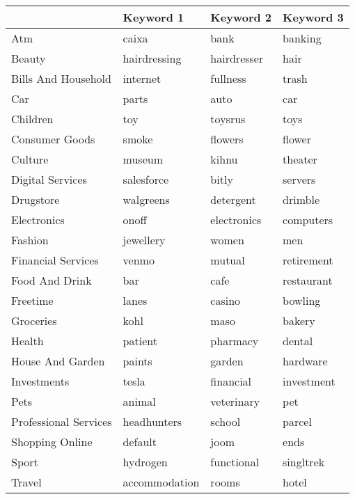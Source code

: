 \begin{tabular}{llll}
\toprule
{} &      Keyword 1 &    Keyword 2 &   Keyword 3 \\
\midrule
Atm                   &          caixa &         bank &     banking \\
Beauty                &   hairdressing &  hairdresser &        hair \\
Bills And Household   &       internet &     fullness &       trash \\
Car                   &          parts &         auto &         car \\
Children              &            toy &      toysrus &        toys \\
Consumer Goods        &          smoke &      flowers &      flower \\
Culture               &         museum &        kihnu &     theater \\
Digital Services      &     salesforce &        bitly &     servers \\
Drugstore             &      walgreens &    detergent &     drimble \\
Electronics           &          onoff &  electronics &   computers \\
Fashion               &      jewellery &        women &         men \\
Financial Services    &          venmo &       mutual &  retirement \\
Food And Drink        &            bar &         cafe &  restaurant \\
Freetime              &          lanes &       casino &     bowling \\
Groceries             &           kohl &         maso &      bakery \\
Health                &        patient &     pharmacy &      dental \\
House And Garden      &         paints &       garden &    hardware \\
Investments           &          tesla &    financial &  investment \\
Pets                  &         animal &   veterinary &         pet \\
Professional Services &    headhunters &       school &      parcel \\
Shopping Online       &        default &         joom &        ends \\
Sport                 &       hydrogen &   functional &   singltrek \\
Travel                &  accommodation &        rooms &       hotel \\
\bottomrule
\end{tabular}
